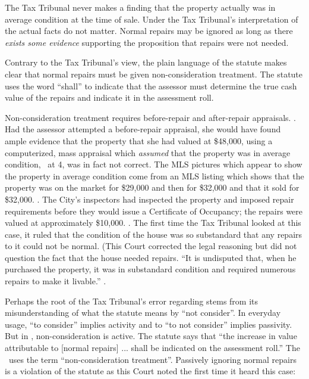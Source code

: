 \documentclass[12pt,\documentclassflag]{michiganCourtOfAppealsBrief}
\begin{document}
The Tax Tribunal never makes a finding that the property actually was in average condition at the time of sale. Under the Tax Tribunal's interpretation of \mathieuGast the actual facts do not matter. Normal repairs may be ignored as long as there \textit{exists some evidence} supporting the proposition that repairs were not needed. 

Contrary to the Tax Tribunal's view, the plain language of the statute makes clear that normal repairs must be given non-consideration treatment. The statute uses the word ``shall'' to indicate that the assessor must determine the true cash value of the repairs and indicate it in the assessment roll.

Non-consideration treatment requires before-repair and after-repair appraisals. . Had the assessor attempted a before-repair appraisal, she would have found ample evidence that the property that she had valued at \$48,000, using a computerized, mass appraisal which \textit{assumed} that the property was in average condition, \FOJ\ at 4, was in fact not correct. The MLS pictures which appear to show the property in average condition come from an MLS listing which shows that the property was on the market for \$29,000 and then for \$32,000 and that it sold for \$32,000. \mlsprintout. The City's inspectors had inspected the property and imposed repair requirements before they would issue a Certificate of Occupancy; the repairs were valued at approximately \$10,000. \repairs. The first time the Tax Tribunal looked at this case, it ruled that the condition of the house was so substandard that any repairs to it could not be normal. (This Court corrected the legal reasoning but did not question the fact that the house needed repairs. ``It is undisputed that, when he purchased the property, it was in substandard condition and required numerous repairs to make it livable.'' .
 
Perhaps the root of the Tax Tribunal's error regarding \mathieuGast stems from its misunderstanding of what the statute means by ``not consider''. In everyday usage, ``to consider'' implies activity and to ``to not consider'' implies passivity. But in \mathieuGast, non-consideration is active. The statute says that ``the increase in value attributable to [normal repairs] ... shall be indicated on the assessment roll.'' The \cite[s]{STC Bulletin 7 of 2014}\ uses the term ``non-consideration treatment''. Passively ignoring normal repairs is a violation of the statute as this Court noted the first time it heard this case:
\end{document}
